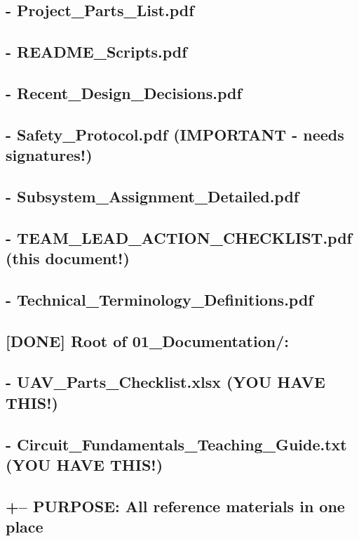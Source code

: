 \documentclass[11pt,letterpaper]{article}
\begin{document}
\subsection*{- Project\_Parts\_List.pdf}

\subsection*{- README\_Scripts.pdf}

\subsection*{- Recent\_Design\_Decisions.pdf}

\subsection*{- Safety\_Protocol.pdf (IMPORTANT - needs signatures!)}

\subsection*{- Subsystem\_Assignment\_Detailed.pdf}

\subsection*{- TEAM\_LEAD\_ACTION\_CHECKLIST.pdf (this document!)}

\subsection*{- Technical\_Terminology\_Definitions.pdf}

\subsection*{[DONE] Root of 01\_Documentation/:}

\subsection*{- UAV\_Parts\_Checklist.xlsx (YOU HAVE THIS!)}

\subsection*{- Circuit\_Fundamentals\_Teaching\_Guide.txt (YOU HAVE THIS!)}

\subsection*{+-- PURPOSE: All reference materials in one place}
\end{document}
